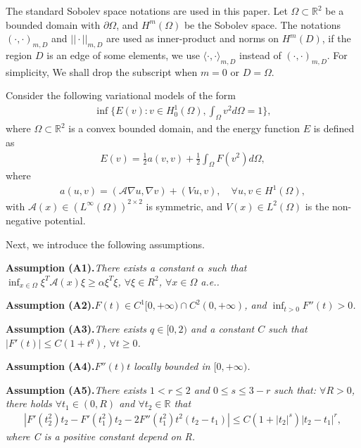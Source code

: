 \documentclass[compress, preprint,9pt]{elsarticle}
\numberwithin{equation}{section}
\newcommand{\A}{\mathcal{A}}
\newcommand{\Real}{\mathbb{R}}
\begin{document}
The standard Sobolev space notations are used in this paper. Let $\Omega\subset\Real^2$ be a bounded domain with $\partial\Omega$, and $H^m(\Omega)$ be the Sobolev space. The notations $(\cdot, \cdot)_{m,D}$ and $||\cdot||_{m,D}$ are used as inner-product and norms on $H^m(D)$, if the region $D$ is an edge of some elements, we use $\langle\cdot,\cdot\rangle _{m,D}$ instead of $(\cdot,\cdot)_{m,D}$. For simplicity, We shall drop the subscript when $m=0$ or $D=\Omega$.

Consider the following variational models of the form
\begin{eqnarray}\label{1.1}
	\inf\{E(v):v\in H_0^1(\Omega),\displaystyle\int_\Omega v^2 d\Omega=1\},
\end{eqnarray}
where $\Omega\subset\Real^2$ is a convex bounded domain, and the energy function $E$ is defined as
\begin{eqnarray}\label{E}
	E(v)=\frac12 a(v,v)+\frac12\displaystyle\int_\Omega F(v^2)d\Omega,
\end{eqnarray}
where
\begin{eqnarray*}
	a(u,v)=(\A\nabla u,\nabla v)+(Vu,v),\quad\forall u,v\in H^1(\Omega),
\end{eqnarray*}
with $\A(x)\in (L^\infty(\Omega))^{2\times2}$ is symmetric, and 
$V(x)\in L^2(\Omega)$ is the non-negative potential.

Next, we introduce the following assumptions.

\textbf{Assumption (A1).}\emph{There exists a constant $\alpha$ such that $\displaystyle\inf_{x\in \Omega}\xi^T\A(x)\xi\ge\alpha\xi^T\xi$, $\forall \xi\in R^2$, $\forall x\in\Omega$ a.e..
}

\textbf{Assumption (A2).}\emph{$F(t)\in C^1[0,+\infty)\cap C^2(0,+\infty)$, and $\displaystyle\inf_{t>0}F''(t)>0$.
}

\textbf{Assumption (A3).}\emph{There exists $q\in [0,2)$ and a constant $C$ such that $|F'(t)|\le C(1+t^q)$, $\forall t\ge0$.
}

\textbf{Assumption (A4).}\emph{$F''(t)t$ locally bounded in $[0,+\infty)$.
}

\textbf{Assumption (A5).}\emph{There exists $1<r\le 2$ and $0\le s\le 3-r$ such that: $\forall R>0$, there holds $\forall t_1\in(0,R)$ and $\forall t_2\in\Real$ that
	\begin{eqnarray*}
		|F'(t_2^2)t_2-F'(t_1^2)t_2-2F''(t_1^2)t^2(t_2-t_1)|\le C(1+|t_2|^s)|t_2-t_1|^r,
	\end{eqnarray*}
	where C is a positive constant depend on R.
}
\end{document}
